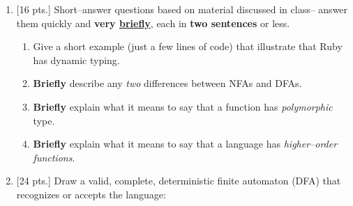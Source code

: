 \documentclass[11pt]{article}
\begin{document}
  \begin{enumerate}


    \item {[16 pts.]} Short--answer questions based on material discussed in
          class-- answer them quickly and \textbf{very \underline{briefly}},
          each in \textbf{two sentences} or less.

          \vspace{-2.5mm}

          \begin{enumerate}

            \addtolength{\itemsep}{28mm}

            \item Give a short example (just a few lines of code) that
                  illustrate that Ruby has dynamic typing.

            \item \textbf{Briefly} describe any \emph{two} differences
                  between NFAs and DFAs.

            \item \textbf{Briefly} explain what it means to say that a
                  function has \emph{polymorphic} type.

            \item \textbf{Briefly} explain what it means to say that a
                  language has \emph{higher--order functions}.

          \end{enumerate}

          \vspace*{26mm}

          \underline{\hspace{6.6225in}}

          \medskip

          \begin{centering}

            \scratchpaper[6.8in]

          \end{centering}

          \pagebreak


    \item {[24 pts.]} Draw a valid, complete, deterministic finite automaton
          (DFA) that recognizes or accepts the language:


\end{enumerate}
\end{document}
